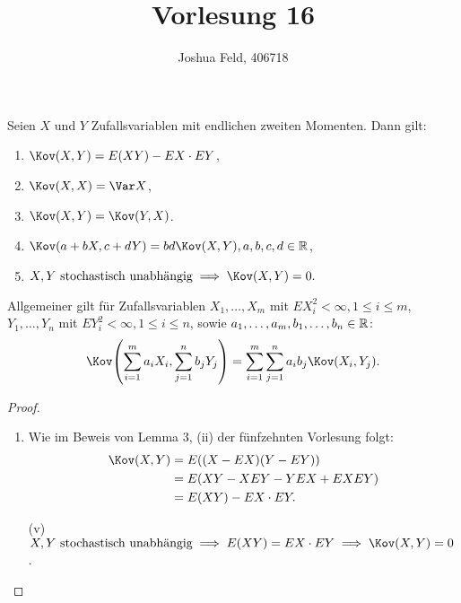\documentclass{lecture}
\institute{Institut für Statistik und Wirtschaftsmathematik}
\title{Vorlesung 16}
\author{Joshua Feld, 406718}
\begin{document}
    \maketitle


    \begin{lemma}
        Seien \(X\) und \(Y\) Zufallsvariablen mit endlichen zweiten Momenten.
        Dann gilt:
        \begin{enumerate}
            \item \(\Kov\parentheses*{X, Y} = E\parentheses*{XY} - EX \cdot EY\),
            \item \(\Kov\parentheses*{X, X} = \Var X\),
            \item \(\Kov\parentheses*{X, Y} = \Kov\parentheses*{Y, X}\).
            \item \(\Kov\parentheses*{a + bX, c + dY} = bd\Kov\parentheses*{X, Y}, a, b, c, d \in \R\),
            \item \(X, Y\text{ stochastisch unabhängig} \implies \Kov\parentheses*{X, Y} = 0.\)
        \end{enumerate}
        Allgemeiner gilt für Zufallsvariablen \(X_1, \ldots, X_m\) mit \(EX_i^2 < \infty, 1 \le i \le m\), \(Y_1, \ldots, Y_n\) mit \(EY_i^2 < \infty, 1 \le i \le n\), sowie \(a_1, \ldots, a_m, b_1, \ldots, b_n \in \mathbb{R}\):
        \[
            \Kov\parentheses*{\sum_{i = 1}^m a_i X_i, \sum_{j = 1}^n b_j Y_j} = \sum_{i = 1}^m \sum_{j = 1}^n a_i b_j\Kov\parentheses*{X_i, Y_j}.
        \]
    \end{lemma}

    \begin{proof}
        \begin{enumerate}
            \item Wie im Beweis von Lemma 3, (ii) der fünfzehnten Vorlesung folgt:
            \begin{align*}
                \Kov\parentheses*{X, Y} &= E\parentheses*{\parentheses*{X - EX}\parentheses*{Y - EY}}\\
                &= E\parentheses*{XY - XEY - YEX + EXEY}\\
                &= E\parentheses*{XY} - EX \cdot EY.
            \end{align*}
            \item[(v)] \(X, Y\text{ stochastisch unabhängig} \implies E\parentheses*{XY} = EX \cdot EY \implies \Kov\parentheses*{X, Y} = 0\).
        \end{enumerate}
    \end{proof}
\end{document}
